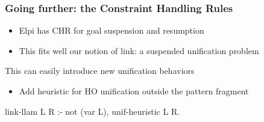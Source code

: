 \documentclass{pres}
\begin{document}
  


\begin{frame}[fragile]
  \frametitle{Going further: the Constraint Handling Rules}

  \begin{itemize}
    \item Elpi has CHR for goal suspension and resumption
    \item This fits well our notion of link: a suspended unification problem
  \end{itemize}


  \mysep

  This can easily introduce new unification behaviors
  \begin{itemize}
    \item Add heuristic for HO unification outside the pattern fragment
  \end{itemize}

  \mysep

  \begin{elpicode}
    link-llam L R :- not (var L), unif-heuristic L R.
  \end{elpicode}



\end{frame}
\end{document}
